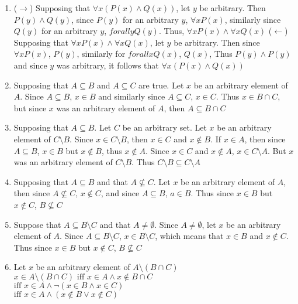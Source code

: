 \begin{enumerate}
    \item
    ($\rightarrow$) Supposing that $\forall x (P(x) \land Q(x))$, let $y$ be arbitrary. Then $P(y) \land Q(y)$, since $P(y)$ for an arbitrary $y$, $\forall x P(x)$, similarly since $Q(y)$ for an arbitrary $y$, $forall y Q(y)$. Thus, $\forall x P(x) \land \forall x Q(x)$
    ($\leftarrow$) Supposing that $\forall x P(x) \land \forall x Q(x)$, let $y$ be arbitrary. Then since $\forall x P(x)$, $P(y)$, similarly for $forall x Q(x)$, $Q(x)$, Thus $P(y) \land P(y)$ and since $y$ was arbitrary, it follows that $\forall x (P(x) \land Q(x))$
    \item
    Supposing that $A \subseteq B$ and $A \subseteq C$ are true. Let $x$ be an arbitrary element of $A$. Since $A \subseteq B$, $x \in B$ and similarly since $A \subseteq C$, $x \in C$. Thus $x \in B \cap C$, but since $x$ was an arbitrary element of $A$, then $A \subseteq B \cap C$
    \item
    Supposing that $A \subseteq B$. Let $C$ be an arbitrary set. Let $x$ be an arbitrary element of $C \setminus B$. Since $x \in C \setminus B$, then $x \in C$ and $x \notin B$. If $x \in A$, then since $A \subseteq B$, $x \in B$ but $x \notin B$, thus $x \notin A$. Since $x \in C$ and $x \notin A$, $x \in C \setminus A$. But $x$ was an arbitrary element of $C \setminus B$. Thus $C \setminus B \subseteq C \setminus A$
    \item
    Supposing that $A \subseteq B$ and that $A \not \subseteq C$. Let $x$ be an arbitrary element of $A$, then since $A \not \subseteq C$, $x \notin C$, and since $A \subseteq B$, $a \in B$. Thus since $x \in B$ but $x \notin C$, $B \not \subseteq C$
    \item
    Suppose that $A \subseteq B \setminus C$ and that $A \neq \emptyset$. Since $A \neq \emptyset$, let $x$ be an arbitrary element of $A$. Since $A \subseteq B \setminus C$, $x \in B \setminus C$, which means that $x \in B$ and $x \notin C$. Thus since $x \in B$ but $x \notin C$, $B \not \subseteq C$
    \item
    Let $x$ be an arbitrary element of $A \setminus (B \cap C)$ \\
    $x \in A \setminus (B \cap C) \text{ iff } x \in A \land x \notin B \cap C$ \\
    $\text{iff } x \in A \land \lnot (x \in B \land x \in C)$\\
    $\text{iff } x \in A \land (x \notin B \lor x \notin C)$\\

\end{enumerate}
